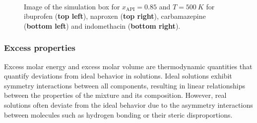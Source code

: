 \begin{figure}[htb!]
	\centering
	\hspace{0.2cm}
	\\
	\vspace{0.2cm}
	\hspace{0.2cm}
	\caption{Image of the simulation box for $x_{\text{API}}=0.85$ and $T=500~K$ for ibuprofen (\textbf{top left}), naproxen (\textbf{top right}), carbamazepine (\textbf{bottom left}) and indomethacin (\textbf{bottom right}).}
	\label{fig:mix_boxes}
\end{figure}
\vspace{-0.5cm}
\subsubsection{Excess properties}
Excess molar energy and excess molar volume are thermodynamic quantities that quantify deviations from ideal behavior in solutions. Ideal solutions exhibit symmetry interactions between all components, resulting in linear relationships between the properties of the mixture and its composition. However, real solutions often deviate from the ideal behavior due to the asymmetry interactions between molecules such as hydrogen bonding or their steric disproportions.

